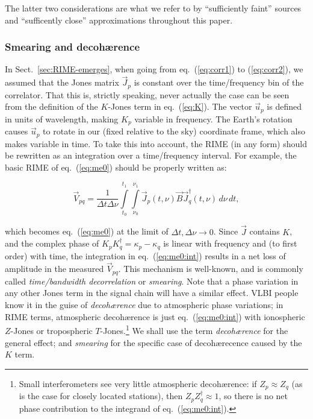 \documentclass[]{aa}
\begin{document}
The latter two considerations are what we refer to by ``sufficiently faint'' sources and ``sufficently close'' approximations throughout this paper.

\subsubsection{\label{sec:smearing}Smearing and decoh{\ae}rence}

In Sect.~\ref{sec:RIME-emerges}, when going from eq.~(\ref{eq:corr1}) to (\ref{eq:corr2}), we assumed that the Jones matrix $\vec J_p$ is constant over the time/frequency bin of the correlator. That this is, strictly speaking, never actually the case can be seen from the definition of the $K$-Jones term in eq.~(\ref{eq:K}). The vector $\vec u_p$ is defined in units of wavelength, making $K_p$ variable in frequency. The Earth's rotation causes $\vec u_p$ to rotate in our (fixed relative to the sky) coordinate frame, which also makes variable in time. To take this into account, the RIME (in any form) should be rewritten as an integration over a time/frequency interval. For example, the basic RIME of eq.~(\ref{eq:me0}) should be properly written as:

\begin{equation}\label{eq:me0:int}
\vec V_{pq} = \frac{1}{\Delta t\Delta\nu}\int\limits^{t_1}_{t_0} \int\limits^{\nu_1}_{\nu_0} \vec J_p (t,\nu) \vec B  \vec J^\dagger_q(t,\nu) \, d\nu\,dt,
\end{equation}

which becomes eq.~(\ref{eq:me0}) at the limit of $\Delta t,\Delta\nu \to 0$. Since $\vec J$ contains $K$, and the complex phase of $K_pK^\dagger_q = \kappa_p-\kappa_q$ is linear with frequency and (to first order) with time, the integration in eq.~(\ref{eq:me0:int}) results in a net loss of amplitude in the measured $\vec V_{pq}$. This mechanism is well-known, and is commonly called {\em time/bandwidth decorrelation} or {\em smearing}. Note that a phase variation in any other Jones term in the signal chain will have a similar effect. VLBI people know it in the guise of {\em decoh{\ae}rence} due to atmospheric phase variations; in RIME terms, atmospheric decoh{\ae}rence is just eq.~(\ref{eq:me0:int}) with ionospheric $Z$-Jones or tropospheric $T$-Jones.\footnote{Small interferometers see very little atmospheric decoh{\ae}rence: if $Z_p\approx Z_q$ (as is the case for closely located stations), then $Z_p Z^\dagger_q \approx 1$, so there is no net phase contribution to the integrand of eq.~(\ref{eq:me0:int}).} We shall use the term {\em decoh{\ae}rence} for the general effect; and {\em smearing} for the specific case of decoh{\ae}recence caused by the $K$ term.
\end{document}
